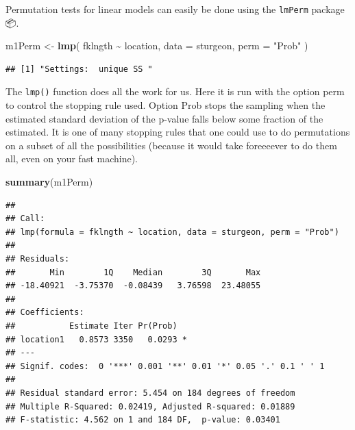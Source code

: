 \documentclass[
  12pt,
]{book}
\newenvironment{Shaded}{\begin{snugshade}}{\end{snugshade}}
\newcommand{\DataTypeTok}[1]{\textcolor[rgb]{0.13,0.29,0.53}{#1}}
\newcommand{\KeywordTok}[1]{\textcolor[rgb]{0.13,0.29,0.53}{\textbf{#1}}}
\newcommand{\NormalTok}[1]{#1}
\newcommand{\OperatorTok}[1]{\textcolor[rgb]{0.81,0.36,0.00}{\textbf{#1}}}
\newcommand{\StringTok}[1]{\textcolor[rgb]{0.31,0.60,0.02}{#1}}
\begin{document}
Permutation tests for linear models can easily be done using the \texttt{lmPerm} package 📦.

\begin{Shaded}
\begin{Highlighting}[]
\NormalTok{m1Perm \textless{}{-}}\StringTok{ }\KeywordTok{lmp}\NormalTok{(}
\NormalTok{  fklngth }\OperatorTok{\textasciitilde{}}\StringTok{ }\NormalTok{location,}
  \DataTypeTok{data =}\NormalTok{ sturgeon,}
  \DataTypeTok{perm =} \StringTok{"Prob"}
\NormalTok{)}
\end{Highlighting}
\end{Shaded}

\begin{verbatim}
## [1] "Settings:  unique SS "
\end{verbatim}

The \texttt{lmp()} function does all the work for us. Here it is run with the option perm to control the stopping rule used. Option Prob stops the sampling when the estimated standard deviation of the p-value falls below some fraction of the estimated. It is one of many stopping rules that one could use to do permutations on a subset of all the possibilities (because it would take foreeeever to do them all, even on your fast machine).

\begin{Shaded}
\begin{Highlighting}[]
\KeywordTok{summary}\NormalTok{(m1Perm)}
\end{Highlighting}
\end{Shaded}

\begin{verbatim}
## 
## Call:
## lmp(formula = fklngth ~ location, data = sturgeon, perm = "Prob")
## 
## Residuals:
##       Min        1Q    Median        3Q       Max 
## -18.40921  -3.75370  -0.08439   3.76598  23.48055 
## 
## Coefficients:
##           Estimate Iter Pr(Prob)  
## location1   0.8573 3350   0.0293 *
## ---
## Signif. codes:  0 '***' 0.001 '**' 0.01 '*' 0.05 '.' 0.1 ' ' 1
## 
## Residual standard error: 5.454 on 184 degrees of freedom
## Multiple R-Squared: 0.02419, Adjusted R-squared: 0.01889 
## F-statistic: 4.562 on 1 and 184 DF,  p-value: 0.03401
\end{verbatim}
\end{document}
